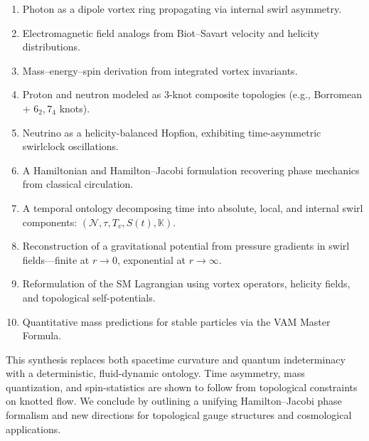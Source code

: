 \begin{enumerate}
    \item Photon as a dipole vortex ring propagating via internal swirl asymmetry.
    \item Electromagnetic field analogs from Biot–Savart velocity and helicity distributions.
    \item Mass–energy–spin derivation from integrated vortex invariants.
    \item Proton and neutron modeled as 3-knot composite topologies (e.g., Borromean + \( 6_2, 7_4 \) knots).
    \item Neutrino as a helicity-balanced Hopfion, exhibiting time-asymmetric swirlclock oscillations.
    \item A Hamiltonian and Hamilton–Jacobi formulation recovering phase mechanics from classical circulation.
    \item A temporal ontology decomposing time into absolute, local, and internal swirl components: \( (\mathcal{N}, \tau, T_v, S(t), \mathbb{K}) \).
    \item Reconstruction of a gravitational potential from pressure gradients in swirl fields—finite at \( r \to 0 \), exponential at \( r \to \infty \).
    \item Reformulation of the SM Lagrangian using vortex operators, helicity fields, and topological self-potentials.
    \item Quantitative mass predictions for stable particles via the VAM Master Formula.
\end{enumerate}

This synthesis replaces both spacetime curvature and quantum indeterminacy with a deterministic, fluid-dynamic ontology. Time asymmetry, mass quantization, and spin-statistics are shown to follow from topological constraints on knotted flow. We conclude by outlining a unifying Hamilton–Jacobi phase formalism and new directions for topological gauge structures and cosmological applications.

